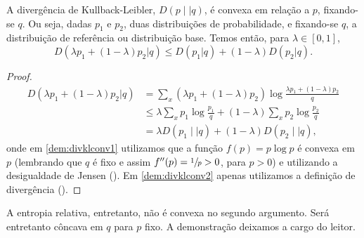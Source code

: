 \begin{theorem}\label{thm:divklconvp}
A divergência de Kullback-Leibler, $D(p \mid\mid q)$, é convexa em relação a $p$, fixando-se $q$.
Ou seja, dadas $p_1$ e $p_2$, duas distribuições de probabilidade, e fixando-se $q$,
a distribuição de referência ou distribuição base. Temos então, para $\lambda \in [0,1]$,
\begin{equation}
D(\lambda p_1+(1-\lambda)p_2|q) \leq D(p_1|q) + (1-\lambda)D(p_2|q) .
\end{equation}
\end{theorem}
\begin{proof}
\begin{subequations}\label{dem:divklconv}
\begin{align}
D(\lambda p_1+(1-\lambda)p_2|q) &= \sum_x \left(\lambda p_1+(1-\lambda)p_2\right)\log\frac{\lambda p_1+(1-\lambda)p_2}{q} \label{dem:divklconv1}\\
				&\leq \lambda \sum_x p_1 \log \frac{p_1}{q} + (1-\lambda) \sum_x p_2 \log \frac{p_2}{q} \label{dem:divklconv2}\\
				&= \lambda D(p_1 \mid\mid q) + (1-\lambda) D(p_2 \mid\mid q) ,\label{dem:divklconv3}
\end{align}
\end{subequations}
onde em \ref{dem:divklconv1} utilizamos que a função $f(p) = p \log p$ é convexa em $p$ 
(lembrando que $q$ é fixo e assim $f''(p) = \sfrac{1}{p} > 0$, para $p>0$) e utilizando
a desigualdade de Jensen (). Em \ref{dem:divklconv2} apenas utilizamos a
definição de divergência ().
\end{proof}
A entropia relativa, entretanto, não é convexa no segundo argumento. Será entretanto
côncava em $q$ para $p$ fixo. A demonstração deixamos a cargo do leitor.

